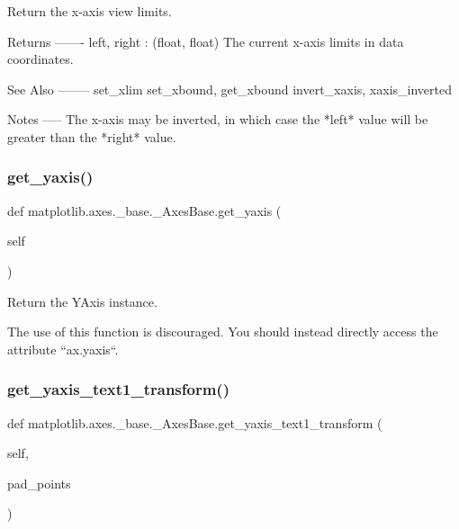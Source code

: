 \begin{DoxyVerb}Return the x-axis view limits.

Returns
-------
left, right : (float, float)
    The current x-axis limits in data coordinates.

See Also
--------
set_xlim
set_xbound, get_xbound
invert_xaxis, xaxis_inverted

Notes
-----
The x-axis may be inverted, in which case the *left* value will
be greater than the *right* value.\end{DoxyVerb}
 \mbox{\label{classmatplotlib_1_1axes_1_1__base_1_1__AxesBase_a22968edec3ef531f13668d456bc95fff}} 
\subsubsection{\texorpdfstring{get\+\_\+yaxis()}{get\_yaxis()}}
{\footnotesize\ttfamily def matplotlib.\+axes.\+\_\+base.\+\_\+\+Axes\+Base.\+get\+\_\+yaxis (\begin{DoxyParamCaption}\item[{}]{self }\end{DoxyParamCaption})}

\begin{DoxyVerb}Return the YAxis instance.

The use of this function is discouraged. You should instead directly
access the attribute ``ax.yaxis``.
\end{DoxyVerb}
 \mbox{\label{classmatplotlib_1_1axes_1_1__base_1_1__AxesBase_af47b86827e80f98e315fc7a67052f98d}} 
\subsubsection{\texorpdfstring{get\+\_\+yaxis\+\_\+text1\+\_\+transform()}{get\_yaxis\_text1\_transform()}}
{\footnotesize\ttfamily def matplotlib.\+axes.\+\_\+base.\+\_\+\+Axes\+Base.\+get\+\_\+yaxis\+\_\+text1\+\_\+transform (\begin{DoxyParamCaption}\item[{}]{self,  }\item[{}]{pad\+\_\+points }\end{DoxyParamCaption})}

